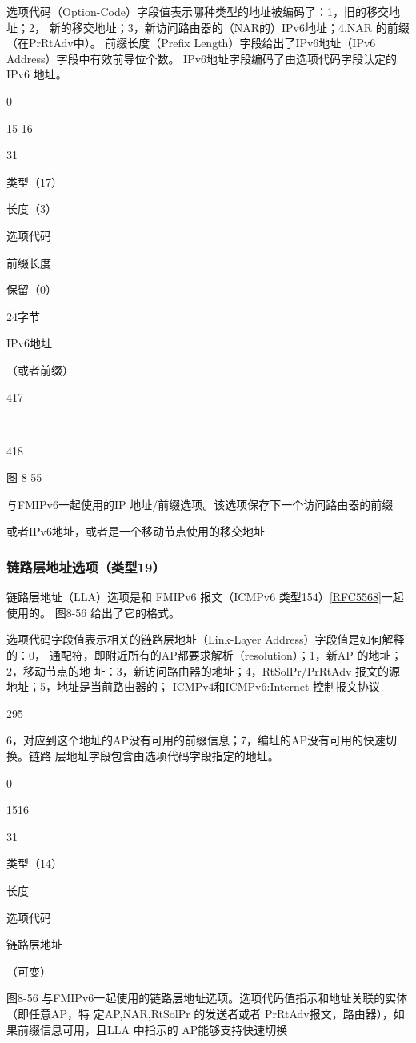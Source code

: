 选项代码（Option-Code）字段值表示哪种类型的地址被编码了：1，旧的移交地址；2，
新的移交地址；3，新访问路由器的（NAR的）IPv6地址；4,NAR 的前缀（在PrRtAdv中）。
前缀长度（Prefix Length）字段给出了IPv6地址（IPv6 Address）字段中有效前导位个数。
IPv6地址字段编码了由选项代码字段认定的 IPv6 地址。

0

15 16

31

类型（17）

长度（3）

选项代码

前缀长度

保留（0）

24字节

IPv6地址

（或者前缀）

417

~

418

图 8-55

与FMIPv6一起使用的IP 地址/前缀选项。该选项保存下一个访问路由器的前缀

或者IPv6地址，或者是一个移动节点使用的移交地址

\subsubsection{链路层地址选项（类型19）}
链路层地址（LLA）选项是和 FMIPv6 报文（ICMPv6 类型154）\href{https://www.rfc-editor.org/rfc/rfc5568}{[RFC5568]}一起使用的。
图8-56 给出了它的格式。

选项代码字段值表示相关的链路层地址（Link-Layer Address）字段值是如何解释的：0，
通配符，即附近所有的AP都要求解析（resolution）；1，新AP 的地址；2，移动节点的地
址：3，新访问路由器的地址；4，RtSolPr/PrRtAdv 报文的源地址；5，地址是当前路由器的；
ICMPv4和ICMPv6:Internet 控制报文协议

295

6，对应到这个地址的AP没有可用的前缀信息；7，编址的AP没有可用的快速切换。链路
层地址字段包含由选项代码字段指定的地址。

0

1516

31

类型（14）

长度

选项代码

链路层地址

（可变）

图8-56 与FMIPv6一起使用的链路层地址选项。选项代码值指示和地址关联的实体（即任意AP，特
定AP,NAR,RtSolPr 的发送者或者 PrRtAdv报文，路由器），如果前缀信息可用，且LLA
中指示的 AP能够支持快速切换

